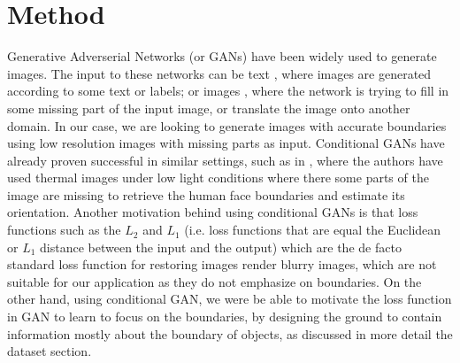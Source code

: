 \section{ Method} \label{method}
Generative Adverserial Networks (or GANs) \cite{GAN} have been widely used to generate images. The input to these networks can be text \cite{text2pix, text2pix2}, where images are generated according to some text or labels; or images \cite{pix2pix, cGANberkeley, TV-GAN, deraning}, where the network is trying to fill in some missing part of the input image, or translate the image onto another domain. In our case, we are looking to generate images with accurate boundaries using low resolution images with missing parts as input. Conditional GANs have already proven successful in similar settings, such as in \cite{hams, TV-GAN}, where the authors have used thermal images under low light conditions where there some parts of the image are missing to retrieve the human face boundaries and estimate its orientation. Another motivation behind using conditional GANs is that loss functions such as the $L_2$ and $L_1$ (i.e. loss functions that are equal the Euclidean or $L_1$ distance between the input and the output) which are the de facto standard loss function for restoring images render blurry images, which are not suitable for our application as they do not emphasize on boundaries. On the other hand, using conditional GAN, we were be able to motivate the loss function in GAN to learn to focus on the boundaries, by designing the ground to contain information mostly about the boundary of objects, as discussed in more detail the dataset section.
	
